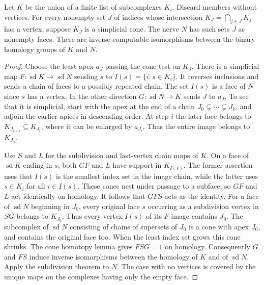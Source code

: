 \begin{theorem}\label{idx-algebraic549}
Let $K$ be the union of a finite list of subcomplexes $K_i$. Discard
members without vertices. For every nonempty set $J$ of indices whose
intersection $K_J=\bigcap_{j\in J}K_j$ has a vertex, suppose $K_J$
is a simplicial cone. The nerve $N$ has such sets $J$ as nonempty
faces. There are inverse computable isomorphisms between the binary
homology groups of $K$ and $N$.
\end{theorem}
\begin{proof}
Choose the least apex $a_J$ passing the cone test on $K_J$.
There is a simplicial map $F:\operatorname{sd}K\to\operatorname{sd}N$
sending $s$ to $I(s)=\{i:s\in K_i\}$. It reverses inclusions
and sends a chain of faces to a possibly repeated chain. The set $I(s)$
is a face of $N$ since $s$ has a vertex. In the other direction
$G:\operatorname{sd}N\to K$ sends $J$ to $a_J$. To see that it is
simplicial, start with the apex at the end of a chain
$J_0\subsetneq\cdots\subsetneq J_k$, and adjoin the earlier apices
in descending order. At step $i$ the later face belongs to
$K_{J_{i+1}}\subseteq K_{J_i}$, where it can be enlarged by $a_{J_i}$.
Thus the entire image belongs to $K_{J_0}$.

Use $S$ and $L$ for the subdivision and last-vertex chain maps of $K$.
On a face of $\operatorname{sd}K$ ending in $s$, both $GF$ and
$L$ have support in $K_{I(s)}$. The former assertion uses that
$I(s)$ is the smallest index set in the image chain, while the latter
uses $s\in K_i$ for all $i\in I(s)$. These cones nest under passage to
a subface, so $GF$ and $L$ act identically on homology. It follows
that $GFS$ acts as the identity. For a face of $\operatorname{sd}N$
beginning in $J_0$, every original face $s$ occurring as a subdivision
vertex in $SG$ belongs to $K_{J_0}$. Thus every vertex $I(s)$ of its
$F$-image contains $J_0$. The subcomplex of $\operatorname{sd}N$
consisting of chains of supersets of $J_0$ is a cone with apex $J_0$,
and contains the original face too. When the least index set grows
this cone shrinks. The cone homotopy lemma gives $FSG=1$ on homology.
Consequently $G$ and $FS$ induce inverse isomorphisms between the
homology of $K$ and of $\operatorname{sd}N$. Apply the subdivision
theorem to $N$. The case with no vertices is covered by the unique
maps on the complexes having only the empty face.
\end{proof}

